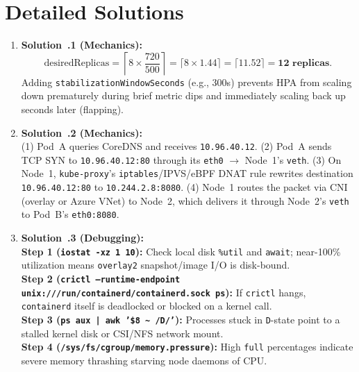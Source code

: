 \section{Detailed Solutions}
\begin{enumerate}[leftmargin=18pt]
  \item \textbf{Solution~\thechapter.1 (Mechanics):}\\
  \begin{equation*}
  \text{desiredReplicas} = \left\lceil 8 \times \frac{720}{500} \right\rceil = \lceil 8 \times 1.44 \rceil = \lceil 11.52 \rceil = \mathbf{12\text{ replicas}}.
  \end{equation*}
  Adding \texttt{stabilizationWindowSeconds} (e.g., 300s) prevents HPA from scaling down prematurely during brief metric dips and immediately scaling back up seconds later (flapping).

  \item \textbf{Solution~\thechapter.2 (Mechanics):}\\
  (1) Pod~A queries CoreDNS and receives \texttt{10.96.40.12}. (2) Pod~A sends TCP SYN to \texttt{10.96.40.12:80} through its \texttt{eth0} $\to$ Node~1's \texttt{veth}. (3) On Node~1, \texttt{kube-proxy}'s \texttt{iptables}/IPVS/eBPF DNAT rule rewrites destination \texttt{10.96.40.12:80} to \texttt{10.244.2.8:8080}. (4) Node~1 routes the packet via CNI (overlay or Azure VNet) to Node~2, which delivers it through Node~2's \texttt{veth} to Pod~B's \texttt{eth0:8080}.

  \item \textbf{Solution~\thechapter.3 (Debugging):}\\
  \textbf{Step 1 (\texttt{iostat -xz 1 10}):} Check local disk \texttt{\%util} and \texttt{await}; near-100\% utilization means \texttt{overlay2} snapshot/image I/O is disk-bound.\\
  \textbf{Step 2 (\texttt{crictl --runtime-endpoint unix:///run/containerd/containerd.sock ps}):} If \texttt{crictl} hangs, \texttt{containerd} itself is deadlocked or blocked on a kernel call.\\
  \textbf{Step 3 (\texttt{ps aux | awk '\$8 \textasciitilde{} /D/'}):} Processes stuck in \texttt{D}-state point to a stalled kernel disk or CSI/NFS network mount.\\
  \textbf{Step 4 (\texttt{/sys/fs/cgroup/memory.pressure}):} High \texttt{full} percentages indicate severe memory thrashing starving node daemons of CPU.


\end{enumerate}
